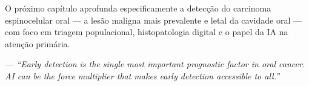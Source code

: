 O próximo capítulo aprofunda especificamente a detecção do carcinoma espinocelular
oral --- a lesão maligna mais prevalente e letal da cavidade oral --- com foco em
triagem populacional, histopatologia digital e o papel da IA na atenção primária.

\begin{flushright}
\itshape\small
--- ``Early detection is the single most important prognostic factor in oral cancer.
AI can be the force multiplier that makes early detection accessible to all.''
\end{flushright}

